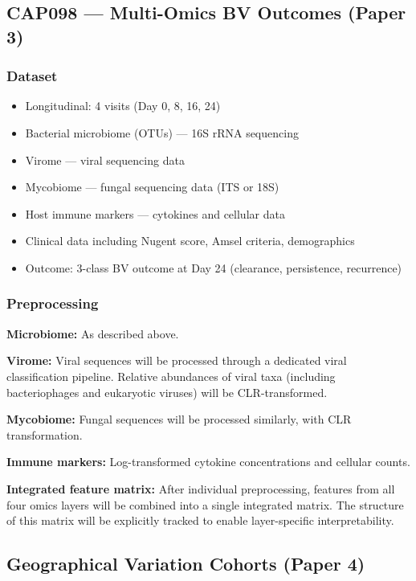 \documentclass[12pt,a4paper]{report}
\begin{document}
\subsection{CAP098 --- Multi-Omics BV Outcomes (Paper 3)}

\subsubsection{Dataset}
\begin{itemize}
    \item Longitudinal: 4 visits (Day 0, 8, 16, 24)
    \item Bacterial microbiome (OTUs) --- 16S rRNA sequencing
    \item Virome --- viral sequencing data
    \item Mycobiome --- fungal sequencing data (ITS or 18S)
    \item Host immune markers --- cytokines and cellular data
    \item Clinical data including Nugent score, Amsel criteria, demographics
    \item Outcome: 3-class BV outcome at Day 24 (clearance, persistence, recurrence)
\end{itemize}

\subsubsection{Preprocessing}

\textbf{Microbiome:} As described above.

\textbf{Virome:} Viral sequences will be processed through a dedicated viral classification pipeline. Relative abundances of viral taxa (including bacteriophages and eukaryotic viruses) will be CLR-transformed.

\textbf{Mycobiome:} Fungal sequences will be processed similarly, with CLR transformation.

\textbf{Immune markers:} Log-transformed cytokine concentrations and cellular counts.

\textbf{Integrated feature matrix:} After individual preprocessing, features from all four omics layers will be combined into a single integrated matrix. The structure of this matrix will be explicitly tracked to enable layer-specific interpretability.

\subsection{Geographical Variation Cohorts (Paper 4)}
\end{document}
